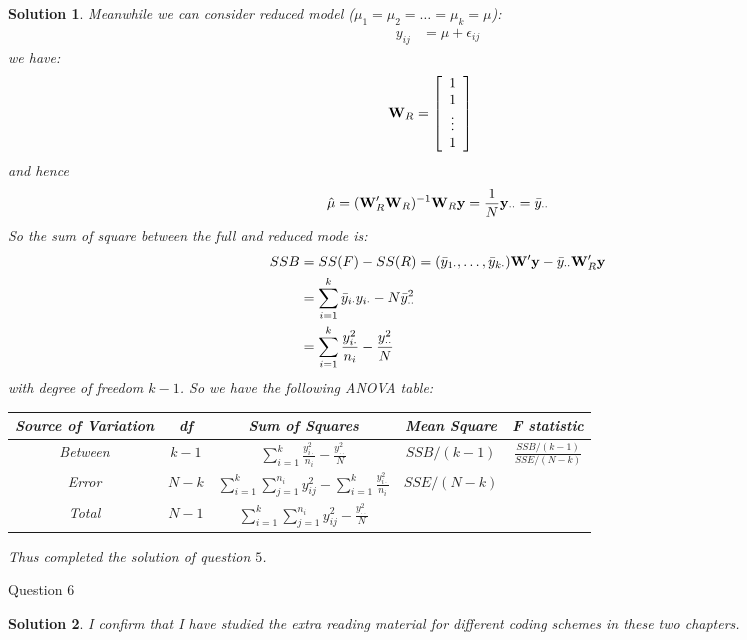 \documentclass[11pt]{article}
\newtheorem{sol}{Solution}
\begin{document}
\begin{sol}
	Meanwhile we can consider reduced model ($\mu_1 = \mu_2 = \ldots = \mu_k = \mu$):
	\begin{align*}
		y_{ij} &= \mu + \epsilon_{ij}
	\end{align*}
	we have:
	\begin{align*}
		{\bf W}_R &= \left[\begin{array}{c} 1\\ 1\\ \vdots\\ 1\end{array}\right]
	\end{align*}
	and hence 
	\begin{align*}
		\hat{\mu} = ({\bf W}_R'{\bf W}_R)^{-1}{\bf W}_R{\bf y} = \frac{1}{N}{\bf y}_{\cdot\cdot} = \bar{y}_{\cdot\cdot}
	\end{align*}
	So the sum of square between the full and reduced mode is:
	\begin{align*}	
	SSB &= SS(F) - SS(R) = (\bar{y}_{1\cdot}, \ldots, \bar{y}_{k\cdot}){\bf W}'{\bf y} - \bar{y}_{\cdot\cdot}{\bf W}'_R{\bf y}\\
	&= \sum_{i = 1}^{k}\bar{y}_{i\cdot}y_{i\cdot} - N\bar{y}^2_{\cdot\cdot}\\
	&= \sum_{i = 1}^{k}\frac{y_{i\cdot}^2}{n_i} - \frac{y^2_{\cdot\cdot}}{N}
	\end{align*}
	with degree of freedom $k - 1$. \vskip 2mm
	So we have the following ANOVA table:\vskip 2mm
	\begin{tabular}{ccccc}
	\hline
		Source of Variation&df&Sum of Squares&Mean Square& F statistic \\
	\hline
		Between&$k - 1$& $\sum_{i = 1}^{k}\frac{y_{i\cdot}^2}{n_i} - \frac{y^2_{\cdot\cdot}}{N}$&$SSB/(k - 1)$&$\frac{SSB/(k - 1)}{SSE/(N - k)}$\\
		Error&$N - k$&$\sum_{i = 1}^k\sum_{j = 1}^{n_i}y^2_{ij} - \sum_{i = 1}^k\frac{y_{i\cdot}^2}{n_i}$&$SSE/(N - k)$&\\
		Total&$N - 1$&$\sum_{i = 1}^k\sum_{j = 1}^{n_i}y^2_{ij}  - \frac{y^2_{\cdot\cdot}}{N}$&&\\
	\hline
	\end{tabular}
	\vskip 2mm
	Thus completed the solution of question $5$.
\end{sol}

Question $6$
\begin{sol}
	I confirm that I have studied the extra reading material for different coding schemes in these two chapters.
\end{sol}
\end{document}
